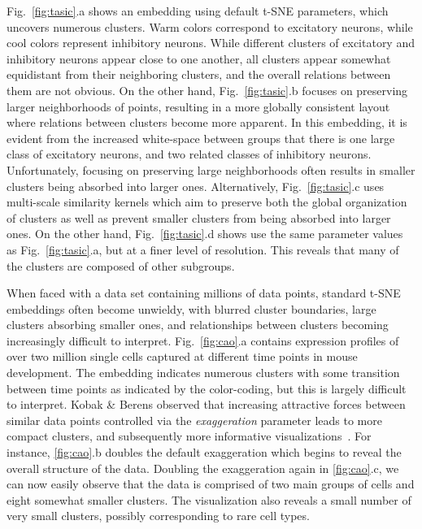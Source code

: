 \documentclass[twocolumn]{bmcart}
\begin{document}
Fig.~\ref{fig:tasic}.a shows an embedding using default t-SNE parameters, which uncovers numerous clusters. Warm colors correspond to excitatory neurons, while cool colors represent inhibitory neurons. While different clusters of excitatory and inhibitory neurons appear close to one another, all clusters appear somewhat equidistant from their neighboring clusters, and the overall relations between them are not obvious. On the other hand, Fig.~\ref{fig:tasic}.b focuses on preserving larger neighborhoods of points, resulting in a more globally consistent layout where relations between clusters become more apparent. In this embedding, it is evident from the increased white-space between groups that there is one large class of excitatory neurons, and two related classes of inhibitory neurons. Unfortunately, focusing on preserving large neighborhoods often results in smaller clusters being absorbed into larger ones. Alternatively, Fig.~\ref{fig:tasic}.c uses multi-scale similarity kernels which aim to preserve both the global organization of clusters as well as prevent smaller clusters from being absorbed into larger ones. On the other hand, Fig.~\ref{fig:tasic}.d shows use the same parameter values as Fig.~\ref{fig:tasic}.a, but at a finer level of resolution. This reveals that many of the clusters are composed of other subgroups.

When faced with a data set containing millions of data points, standard t-SNE embeddings often become unwieldy, with blurred cluster boundaries, large clusters absorbing smaller ones, and relationships between clusters becoming increasingly difficult to interpret. Fig.~\ref{fig:cao}.a contains expression profiles of over two million single cells captured at different time points in mouse development. The embedding indicates numerous clusters with some transition between time points as indicated by the color-coding, but this is largely difficult to interpret. Kobak \& Berens observed that increasing attractive forces between similar data points controlled via the \textit{exaggeration} parameter leads to more compact clusters, and subsequently more informative visualizations~\cite{kobak2019art}. For instance, \ref{fig:cao}.b doubles the default exaggeration  which begins to reveal the overall structure of the data. Doubling the exaggeration again in \ref{fig:cao}.c, we can now easily observe that the data is comprised of two main groups of cells and eight somewhat smaller clusters. The visualization also reveals a small number of very small clusters, possibly corresponding to rare cell types.
\end{document}
